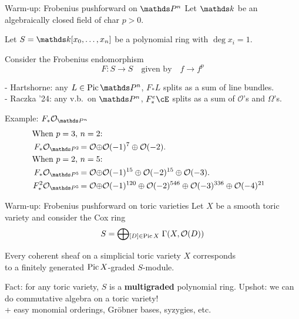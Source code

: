 \documentclass[beamer]{paper}
\def\OO{\mathcal{O}}
\begin{document}
\begin{frame}[t]{Warm-up: Frobenius pushforward on $\PPn$}
  Let $\kk$ be an algebraically closed field of char $p>0$.

  Let $S = \kk[x_0,\dots,x_n]$ be a polynomial ring with $\deg x_i = 1$.

  \vfill
  Consider the Frobenius endomorphism
  \[ F\colon S\to S \quad \text{given by} \quad f \to f^p \]

  - Hartshorne: any $L\in\Pic\PPn$, $F_*L$ splits as a sum of line bundles. \\
  - Raczka '24: any v.b.\ on $\PPn$, $F_*^e\cE$ splits as a sum of $\OO$'s and $\Omega$'s.
  \begin{block}{Example: $F_*\o_{\PPn}$}
    \vspace*{-0.2in}
    \begin{align*}
      \text{When $p=3$, $n=2$:} \\
      F_*\o_{\PP2} = \o \oplus &\o(-1)^7 \oplus \o(-2). \\
      \text{When $p=2$, $n=5$:} \\
      F_*\o_{\PP5} = \o \oplus &\o(-1)^{15} \oplus \o(-2)^{15} \oplus \o(-3). \\
      F_*^2\o_{\PP5} = \o \oplus &\o(-1)^{120} \oplus \o(-2)^{546} \oplus \o(-3)^{336} \oplus \o(-4)^{21}
    \end{align*}
  \end{block}
\end{frame}


\begin{frame}[t]{Warm-up: Frobenius pushforward on toric varieties}
  Let $X$ be a smooth toric variety and consider the Cox ring
  \[ S = \bigoplus\!{}_{[D]\in\Pic{X}} \; \Gamma(X, \OO(D)) \]

  \begin{theorem}
    Every coherent sheaf on a simplicial toric variety $X$ corresponds \\
    to a finitely generated $\operatorname{Pic}X$-graded $S$-module.
  \end{theorem}

  \vfill
  Fact: for any toric variety, $S$ is a \textbf{multigraded} polynomial ring.
  Upshot: we can do commutative algebra on a toric variety! \\
  \hfill + easy monomial orderings, Gr\"obner bases, syzygies, etc.
\end{frame}
\end{document}
